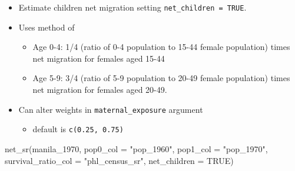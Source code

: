 \documentclass[
]{book}
\newenvironment{Shaded}{\begin{snugshade}}{\end{snugshade}}
\newcommand{\AttributeTok}[1]{\textcolor[rgb]{0.77,0.63,0.00}{#1}}
\newcommand{\ConstantTok}[1]{\textcolor[rgb]{0.00,0.00,0.00}{#1}}
\newcommand{\FunctionTok}[1]{\textcolor[rgb]{0.00,0.00,0.00}{#1}}
\newcommand{\NormalTok}[1]{#1}
\newcommand{\StringTok}[1]{\textcolor[rgb]{0.31,0.60,0.02}{#1}}
\providecommand{\tightlist}{%
  \setlength{\itemsep}{0pt}\setlength{\parskip}{0pt}}
\begin{document}
\begin{itemize}
\tightlist
\item
  Estimate children net migration setting \texttt{net\_children\ =\ TRUE}.
\item
  Uses method of \citet[p381]{Shryock1976}

  \begin{itemize}
  \tightlist
  \item
    Age 0-4: 1/4 (ratio of 0-4 population to 15-44 female population) times net migration for females aged 15-44
  \item
    Age 5-9: 3/4 (ratio of 5-9 population to 20-49 female population) times net migration for females aged 20-49.
  \end{itemize}
\item
  Can alter weights in \texttt{maternal\_exposure} argument

  \begin{itemize}
  \tightlist
  \item
    default is \texttt{c(0.25,\ 0.75)}
  \end{itemize}
\end{itemize}

\begin{Shaded}
\begin{Highlighting}[]
\FunctionTok{net\_sr}\NormalTok{(manila\_1970, }\AttributeTok{pop0\_col =} \StringTok{"pop\_1960"}\NormalTok{, }\AttributeTok{pop1\_col =} \StringTok{"pop\_1970"}\NormalTok{,}
       \AttributeTok{survival\_ratio\_col =} \StringTok{"phl\_census\_sr"}\NormalTok{, }\AttributeTok{net\_children =} \ConstantTok{TRUE}\NormalTok{)}
\end{Highlighting}
\end{Shaded}
\end{document}
